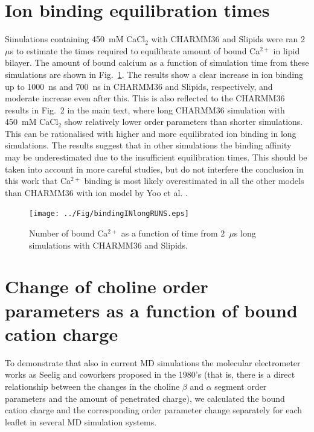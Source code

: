\documentclass[twoside,twocolumn,9pt]{article}
\begin{document}



\section{Ion binding equilibration times}
Simulations containing 450~mM CaCl$_2$ with CHARMM36 and Slipids were ran 2~$\mu$s to estimate the times
required to equilibrate amount of bound Ca$^{2+}$ in lipid bilayer. The amount of bound calcium
as a function of simulation time from these simulations are shown in Fig.~\ref{longruns}.
The results show a clear increase in ion binding up to 1000~ns and 700~ns in CHARMM36 and Slipids, respectively,
and moderate increase even after this. This is also reflected to the CHARMM36 results in Fig.~2 in the main text, where
long CHARMM36 simulation with 450~mM CaCl$_2$ show relatively lower order parameters than shorter simulations. 
This can be rationalised with higher and more equilibrated ion binding in long simulations. 
The results suggest that in other simulations the binding affinity 
may be underestimated due to the insufficient equilibration times. This should be taken into account in more careful studies,
but do not interfere the conclusion in this work that Ca$^{2+}$ binding is most likely overestimated in all the
other models than CHARMM36 with ion model by Yoo et al. \cite{yoo16}.
\begin{figure}[h]
  \centering
  \texttt{[image: ../Fig/bindingINlongRUNS.eps]} 
  \caption{\label{longruns}
    Number of bound Ca$^{2+}$ as a function of time from 2~$\mu$s long simulations with CHARMM36 and Slipids.
}
\end{figure}


\section{Change of choline order parameters as a function of bound cation charge}


To demonstrate that also in current MD simulations the molecular electrometer works as Seelig and coworkers proposed in the 1980's (that is, there is a direct relationship between the changes in the choline $\beta$ and $\alpha$ segment order parameters and the amount of penetrated charge), we calculated the bound cation charge and the corresponding order parameter change separately for each leaflet in several MD simulation systems.
\end{document}
